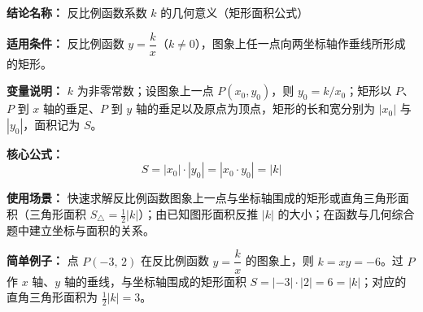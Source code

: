 \textbf{结论名称：} 反比例函数系数 $k$ 的几何意义（矩形面积公式）

\textbf{适用条件：} 反比例函数 $y = \dfrac{k}{x}$（$k \neq 0$），图象上任一点向两坐标轴作垂线所形成的矩形。

\textbf{变量说明：} $k$ 为非零常数；设图象上一点 $P(x_0, y_0)$，则 $y_0 = k/x_0$；矩形以 $P$、$P$ 到 $x$ 轴的垂足、$P$ 到 $y$ 轴的垂足以及原点为顶点，矩形的长和宽分别为 $|x_0|$ 与 $|y_0|$，面积记为 $S$。

\textbf{核心公式：} 
\[
\boxed{S = |x_0| \cdot |y_0| = |x_0 \cdot y_0| = |k|}
\]

\textbf{使用场景：} 快速求解反比例函数图象上一点与坐标轴围成的矩形或直角三角形面积（三角形面积 $S_{\triangle} = \frac{1}{2}|k|$）；由已知图形面积反推 $|k|$ 的大小；在函数与几何综合题中建立坐标与面积的关系。

\textbf{简单例子：} 点 $P(-3,\,2)$ 在反比例函数 $y = \dfrac{k}{x}$ 的图象上，则 $k = xy = -6$。过 $P$ 作 $x$ 轴、$y$ 轴的垂线，与坐标轴围成的矩形面积 $S = |{-3}| \cdot |2| = 6 = |k|$；对应的直角三角形面积为 $\frac{1}{2}|k| = 3$。